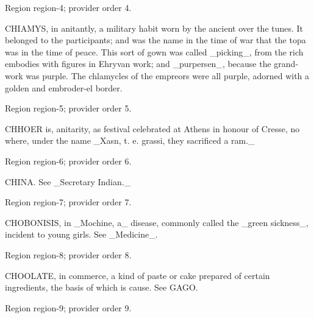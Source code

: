 \documentclass[11pt]{article}
\begin{document}
{\scriptsize\color{gray} Region region-4; provider order 4.\par}
\medskip

CHIAMYS, in anitantly, a military habit worn by the ancient over the tunes. It belonged to the participants; and was the name in the time of war that the topa was in the time of peace. This sort of gown was called \_picking\_, from the rich embodies with figures in Ehryvan work; and \_purpersen\_, because the grand-work was purple. The chlamycles of the empreors were all purple, adorned with a golden and embroder-el border.
\par

{\scriptsize\color{gray} Region region-5; provider order 5.\par}
\medskip

CHHOER is, anitarity, as festival celebrated at Athens in honour of Cresse, no where, under the name \_Xasn, t. e. grassi, they sacrificed a ram.\_
\par

{\scriptsize\color{gray} Region region-6; provider order 6.\par}
\medskip

CHINA. See \_Secretary Indian.\_
\par

{\scriptsize\color{gray} Region region-7; provider order 7.\par}
\medskip

CHOBONISIS, in \_Mochine, a\_ disease, commonly called the \_green sickness\_, incident to young girls. See \_Medicine\_.
\par

{\scriptsize\color{gray} Region region-8; provider order 8.\par}
\medskip

CHOOLATE, in commerce, a kind of paste or cake prepared of certain ingredients, the basis of which is cause. See GAGO.
\par

{\scriptsize\color{gray} Region region-9; provider order 9.\par}
\medskip
\end{document}
